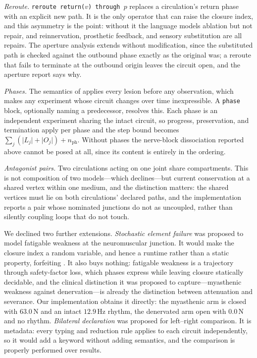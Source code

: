 \documentclass[11pt,twocolumn,a4paper]{article}
\theoremstyle{thmstyle}
\theoremstyle{definition}
\theoremstyle{remark}
\newcommand{\abs}[1]{\lvert#1\rvert}
\begin{document}
\emph{Reroute.} \texttt{reroute return($v$) through $p$} replaces a
circulation's return phase with an explicit new path. It is the only
operator that can raise the closure index, and this asymmetry is the point:
without it the language models ablation but not repair, and reinnervation,
prosthetic feedback, and sensory substitution are all repairs. The aperture
analysis extends without modification, since the substituted path is checked
against the outbound phase exactly as the original was; a reroute that fails
to terminate at the outbound origin leaves the circuit open, and the
aperture report says why.

\emph{Phases.} The semantics of  applies every lesion
before any observation, which makes any experiment whose circuit changes
over time inexpressible. A \texttt{phase} block, optionally naming a
predecessor, resolves this. Each phase is an independent experiment sharing
the intact circuit, so progress, preservation, and termination apply per
phase and the step bound becomes
$\sum_j(\abs{L_j}+\abs{O_j})+n_{\mathrm{ph}}$. Without phases the
nerve-block dissociation reported above cannot be posed at all, since its
content is entirely in the ordering.

\emph{Antagonist pairs.} Two circulations acting on one joint share
compartments. This is not composition of two models---which 
declines---but current conservation at a shared vertex within one medium,
and the distinction matters: the shared vertices must lie on both
circulations' declared paths, and the implementation reports a pair whose
nominated junctions do not as uncoupled, rather than silently coupling loops
that do not touch.

We declined two further extensions. \emph{Stochastic element failure} was
proposed to model fatigable weakness at the neuromuscular junction. It would
make the closure index a random variable, and hence a runtime rather than a
static property, forfeiting . It also buys
nothing: fatigable weakness is a trajectory through safety-factor loss,
which phases express while leaving closure statically decidable, and the
clinical distinction it was proposed to capture---myasthenic weakness
against denervation---is already the distinction between attenuation and
severance. Our implementation obtains it directly: the myasthenic arm is
closed with $63.0$\,N and an intact $12.9$\,Hz rhythm, the denervated arm
open with $0.0$\,N and no rhythm. \emph{Bilateral declaration} was proposed
for left--right comparison. It is metadata: every typing and reduction rule
applies to each circuit independently, so it would add a keyword without
adding semantics, and the comparison is properly performed over results.
\end{document}
